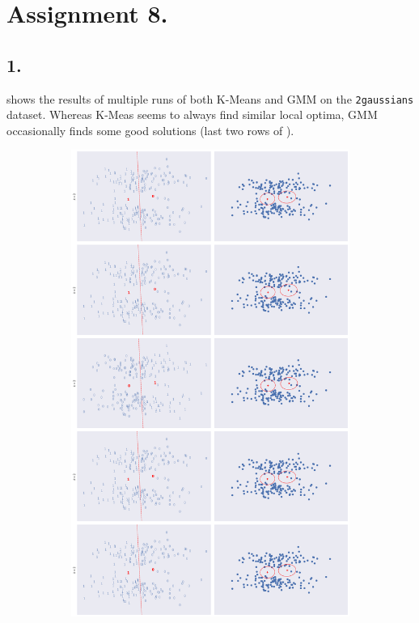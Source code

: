 \documentclass[a4paper,11pt]{article}
\begin{document}
\section*{Assignment 8.}
\subsection*{1.}

 shows the results of multiple runs of both K-Means and GMM on the \verb|2gaussians| dataset.
Whereas K-Meas seems to always find similar local optima, GMM occasionally finds some good solutions (last two rows of ).


\begin{figure}
    \centering
    \begin{subfigure}[b]{0.45\textwidth}
        \includegraphics[scale=0.15]{../images/assignment8_kmeans_init.png}

\end{subfigure}
\end{figure}
\end{document}
